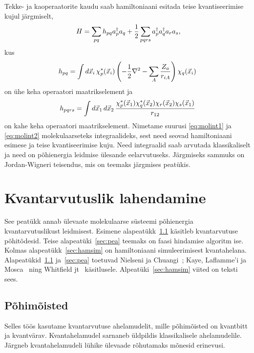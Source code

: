 \documentclass[12pt]{report}
\def\paren#1{\left(#1\right)}
\def\d#1{\mathinner{d#1}}
\begin{document}
Tekke- ja kaoperaatorite kaudu saab hamiltoniaani esitada teise kvantiseerimise kujul järgmiselt,
\begin{align}
    H = \sum_{pq}h_{pq}a_p^\dagger a_q
    + \frac{1}{2} \sum_{pqrs} a_p^\dagger a_q^\dagger a_r a_s \rlap{,}
\end{align}
kus
\begin{align}\label{eq:molint1}
    h_{pq} = \int\d{\vec{x}_i} \chi_p^*(\vec{x}_i)
    \paren{-\frac{1}{2} \nabla^2 - \sum_A \frac{Z_a}{r_{iA}}} \chi_q(\vec{x}_i)
\end{align}
on ühe keha operaatori maatrikselement ja
\begin{align}\label{eq:molint2}
    h_{pqrs} = \int \d{\vec{x}_1} \d{\vec{x}_2}
    \frac{\chi_p^*(\vec{x}_1) \chi_q^*(\vec{x}_2) \chi_r(\vec{x}_2) \chi_s(\vec{x}_1)}{r_{12}}
\end{align}
on kahe keha operaatori maatrikselement.
Nimetame suurusi \eqref{eq:molint1} ja \eqref{eq:molint2} molekulaarseteks integraalideks, sest need seovad hamiltoniaani esimese ja teise kvantiseerimise kuju.
Need integraalid saab arvutada klassikaliselt ja need on põhienergia leidmise ülesande eelarvutuseks.
Järgmiseks sammuks on Jordan-Wigneri teisendus, mis on teemaks järgmises peatükis.

\chapter{Kvantarvutuslik lahendamine}\label{chap:qcomp}

See peatükk annab ülevaate molekulaarse süsteemi põhienergia kvantarvutuslikust leidmisest.
Esimene alapeatükk~\ref{sec:terms} käsitleb kvantarvutuse põhitõdesid.
Teise alapeatüki~\ref{sec:pea} teemaks on faasi hindamise algoritm ise.
Kolmas alapeatükk~\ref{sec:hamsim} on hamiltoniaani simuleerimisest kvantahelana.
Alapeatükid~\ref{sec:terms} ja~\ref{sec:pea} toetuvad Nielseni ja Chuangi~\cite{nielsen+chuang}; Kaye, Laflamme'i ja Mosca~\cite{kaye+laflamme+mosca} ning Whitfield jt~\cite{whitfield+etal2011} käsitlusele.
Alpeatüki~\ref{sec:hamsim} viited on teksti sees.

\section{Põhimõisted}\label{sec:terms}

Selles töös kasutame kvantarvutuse ahelamudelit, mille põhimõisted on kvantbitt ja kvantvärav.
Kvantahelamudel sarnaneb üldpildis klassikalisele ahelamudelile.
Järgneb kvantahelamudeli lühike ülevaade rõhutamaks mõnesid erinevusi.
\end{document}

